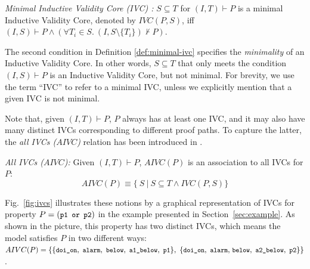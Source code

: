 \begin{definition}{\emph{Minimal Inductive Validity Core (IVC) \cite{Ghass16}:}}
  \label{def:minimal-ivc}
  $S \subseteq T$ for $(I, T)\vdash P$ is a minimal Inductive Validity Core,
  denoted by $IVC(P, S)$, iff
  $(I, S) \vdash P \wedge (\forall T_i \in S.~ (I, S\setminus\{ T_i \}) \nvdash P) $.
\end{definition}

\noindent The second condition in Definition \ref{def:minimal-ivc}
specifies the \emph{minimality} of an Inductive Validity Core.
In other words, $S \subseteq T$ that only meets the condition $(I, S) \vdash P$ is
an Inductive Validity Core, but not minimal.
For brevity, we use the term ``IVC'' to refer to a minimal IVC, unless
we explicitly mention that a given IVC is not minimal.

Note that, given $(I, T) \vdash P$, $P$ always has at least one IVC, and it may also have many distinct IVCs corresponding to different proof paths. To capture the latter, the \emph{all IVCs ($AIVC$)} relation has been introduced in \cite{Ghass16, Murugesan16:renext, Ghass17Cov}.
\begin{definition}{\emph{All IVCs ($AIVC$)\cite{Murugesan16:renext, Ghass17Cov}:}}
    \label{def:allivcs}
    Given $(I, T) \vdash P$, $AIVC(P)$ is an association to all IVCs for $P$:
    $$ AIVC(P) \equiv  \{\ S~|~S \subseteq T \land  IVC(P, S)\} $$
\end{definition}

Fig.~\ref{fig:ivcs} illustrates these notions by a graphical representation of IVCs for property $P = (\small{\texttt{p1 or p2}})$ in the example presented in Section~\ref{sec:example}. As shown in the picture, this property has two distinct IVCs, which means the model satisfies $P$ in two different ways:
$AIVC(P) = \{ \{ \small{ \texttt{doi\_on},
~\texttt{alarm},~\texttt{below},~\texttt{a1\_below},~\texttt{p1}\},~
\{ \texttt{doi\_on},~\texttt{alarm},}  \allowbreak \small{
~\texttt{below},~\texttt{a2\_below},~\texttt{p2}\} }\}$.


